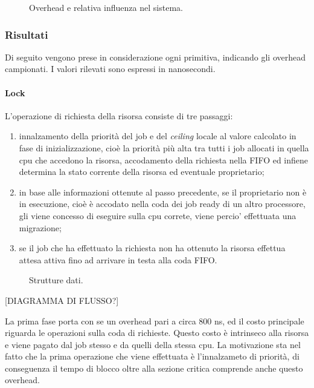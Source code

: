 \begin{figure}
\centering
{}
\caption{Overhead e relativa influenza nel sistema.}
\label{fig:overheads_suffered}
\end{figure}

\subsubsection{Risultati}
\label{sec:overhead_ris}

\noindent Di seguito vengono prese in considerazione ogni primitiva, indicando gli overhead campionati. I valori rilevati sono espressi in nanosecondi.

\paragraph{Lock}  L'operazione di richiesta della risorsa consiste di tre passaggi:

\begin{enumerate}
	\item innalzamento della priorità del job e del \textit{ceiling} locale al valore calcolato in fase di inizializzazione, cioè la priorità più alta tra tutti i job allocati in quella cpu che accedono la risorsa, accodamento della richiesta nella FIFO ed infiene determina la stato corrente della risorsa ed eventuale proprietario;
	\item in base alle informazioni ottenute al passo precedente, se il proprietario non è in esecuzione, cioè è accodato nella coda dei job ready di un altro processore, gli viene concesso di eseguire sulla cpu correte, viene percio' effettuata una migrazione;
	\item se il job che ha effettuato la richiesta non ha ottenuto la risorsa effettua attesa attiva fino ad arrivare in testa alla coda FIFO.
\end{enumerate}

\begin{figure}
\centering
{}
\caption{Strutture dati.}
\label{fig:datas}
\end{figure}

[DIAGRAMMA DI FLUSSO?]

\noindent La prima fase porta con se un overhead pari a circa 800 ns, ed il costo principale riguarda le operazioni sulla coda di richieste. Questo costo è intrinseco alla risorsa e viene pagato dal job stesso e da quelli della stessa cpu. La motivazione sta nel fatto che la prima operazione che viene effettuata è l'innalzameto di priorità, di conseguenza il tempo di blocco oltre alla sezione critica comprende anche questo overhead.\\

